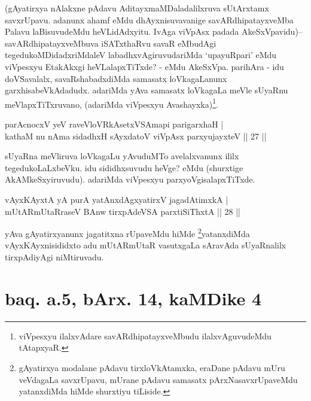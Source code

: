 \begin{artha} 
(gAyatirxya nAlakxne pAdavu AditayxmaMDaladalilxruva sUtArxtamx 
savxrUpavu. adanunx ahamf eMdu dhAyxnisuvavanige savARdhipatayxveMba 
Palavu laBisuvudeMdu heVLidAdxyitu. IvAga viVpAsx padada 
AkeSxVpavidu){\rm --} savARdhipatayxveMbuva iSATxthaRvu savaR eMbudAgi 
tegedukoMDidadxriMdaleV labadhxvAgiruvudariMda `upayuRpari' eMdu 
viVpesxyu EtakAkxgi heVLalapxTiTxde? - eMdu AkeSxVpa. parihAra - idu 
doVSavalalx, savaRshabadxdiMda samasatx loVkagaLanunx 
garxhisabeVkAdadudx. adariMda yAva samasatx loVkagaLa meVle sUyaRnu 
meVlapxTiTxruvano, (adariMda viVpesxyu 
Avashayxka)\footnote[1]{viVpesxyu ilalxvAdare savARdhipatayxveMbudu 
ilalxvAguvudeMdu tAtapxyaR.}.
\end{artha}


\begin{shl}
parAcnocxV yeV raveVloVRkAsetxVSAmapi parigarxhaH | \\
kathaM nu nAma sidadhxH sAyxdatoV viVpAsx parxyujayxteV \hfill ||  27 || 
\end{shl}

\begin{artha} 
sUyaRna meVliruva loVkagaLu yAvuduMTo avelalxvanunx ililx 
tegedukoLaLxbeVku. idu sididhxsuvudu heVge? eMdu (shurxtige 
AkAMkeSxyiruvudu). adariMda viVpesxyu parxyoVgisalapxTiTxde.
\end{artha}


\begin{shl}
vAyxKAyxtA yA purA yatAnxdAgxyatirxV jagadAtimxkA | \\
mUtARmUtaRraseV BAnw tirxpAdeVSA parxtiSiThxtA \hfill ||  28 || 
\end{shl}

\begin{artha} 
yAva gAyatirxyanunx jagatitxna rUpaveMdu hiMde 
\footnote[2]{gAyatirxya modalane pAdavu tirxloVkAtamxka, eraDane 
pAdavu mUru veVdagaLa savxrUpavu, mUrane pAdavu samasatx 
pArxNasavxrUpaveMdu yatanxdiMda hiMde shurxtiyu tiLiside.}yatanxdiMda  vAyxKAyxnisididxto adu mUtARmUtaR vasutxgaLa 
sAravAda sUyaRnalilx tirxpAdiyAgi niMtiruvadu.
\end{artha}

\section*{baq. a.5, bArx. 14, kaMDike 4}

